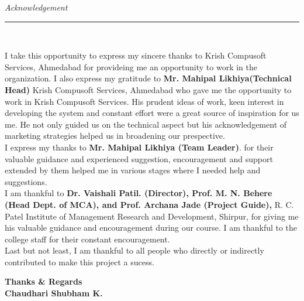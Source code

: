 \thispagestyle{empty}
\begin{flushright}
\textit{\Large \textcolor{black} Acknowledgement}\
\rule{6in}{.1pt}\\[0.5cm]
\end{flushright}
\justifying
\begin{spacing}{1.5}
I take this opportunity to express my sincere thanks to Krish Compusoft Services, Ahmedabad for provideing me an opportunity to work in the organization. I also express my gratitude to \textbf{ Mr. Mahipal Likhiya(Technical Head)} Krish Compusoft Services, Ahmedabad who gave me the opportunity to work in Krish Compusoft Services. His prudent ideas of work, keen interest in developing the system and constant effort were a great source of inspiration for us me. He not only guided us on the technical aspect but his acknowledgement of marketing strategies helped us in broadening our prespective.\\
	 I express my thanks to \textbf {Mr. Mahipal Likhiya (Team Leader)}. for their valuable guidance and experienced suggestion, encouragement and support extended by them helped me in various stages where I needed help and suggestions.\\
	 I am thankful to \textbf{Dr. Vaishali Patil. (Director), Prof. M. N. Behere (Head Dept. of MCA), and Prof. Archana Jade (Project Guide),  } R. C. Patel Institute of Management Research and Development, Shirpur, for giving me his valuable guidance and encouragement during our course. I am thankful to the college staff for their constant encouragement.\\
	 Last but not least, I am thankful to all people who directly or indirectly contributed to make this project a sucess.\\

	
 	
	
	
\begin{flushright}
\begin{spacing}{1}
\textbf{Thanks \& Regards}\\[.03cm]
\textbf{Chaudhari Shubham K.}\\[.01cm]

\end{spacing}
\end{flushright}
\end{spacing}

